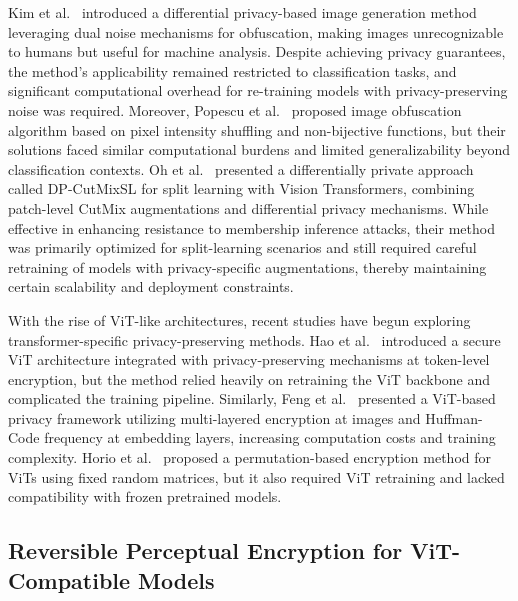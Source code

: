 \documentclass{ieeeaccess}
\newcommand{\rev}[1]{{\color{green}#1}}
\begin{document}
Kim et al.~\cite{s24103166} introduced a differential privacy-based image generation method leveraging dual noise mechanisms for obfuscation, making images unrecognizable to humans but useful for machine analysis. Despite achieving privacy guarantees, the method's applicability remained restricted to classification tasks, and significant computational overhead for re-training models with privacy-preserving noise was required. Moreover, Popescu et al.~\cite{9786187} proposed image obfuscation algorithm based on pixel intensity shuffling and non-bijective functions, but their solutions faced similar computational burdens and limited generalizability beyond classification contexts. Oh et al.~\cite{oh2022differentially} presented a differentially private approach called DP-CutMixSL for split learning with Vision Transformers, combining patch-level CutMix augmentations and differential privacy mechanisms. While effective in enhancing resistance to membership inference attacks, their method was primarily optimized for split-learning scenarios and still required careful retraining of models with privacy-specific augmentations, thereby maintaining certain scalability and deployment constraints.

With the rise of ViT-like architectures, recent studies have begun exploring transformer-specific privacy-preserving methods. Hao et al.~\cite{hao2023privacypreserving} introduced a secure ViT architecture integrated with privacy-preserving mechanisms at token-level encryption, but the method relied heavily on retraining the ViT backbone and complicated the training pipeline. Similarly, Feng et al.~\cite{10445482} presented a ViT-based privacy framework utilizing multi-layered encryption at images and Huffman-Code frequency at embedding layers, increasing computation costs and training complexity. Horio et al.~\cite{horio2024privacypreservingvisiontransformerusing} proposed a permutation-based encryption method for ViTs using fixed random matrices, but it also required ViT retraining and lacked compatibility with frozen pretrained models.

\subsection{\rev{Reversible Perceptual Encryption for ViT-Compatible Models}}
\end{document}
